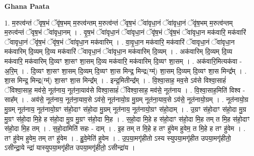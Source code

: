 \documentclass[17pt]{extarticle}
\begin{document}
\textbf{Ghana Paata } \newline

1. म॒रुत्व॑न्तं ॅवृष॒भं ॅवृ॑ष॒भम् म॒रुत्व॑न्तम् म॒रुत्व॑न्तं ॅवृष॒भं ॅवा॑वृधा॒नं ॅवा॑वृधा॒नं ॅवृ॑ष॒भम् म॒रुत्व॑न्तम् म॒रुत्व॑न्तं ॅवृष॒भं ॅवा॑वृधा॒नम् । . वृ॒ष॒भं ॅवा॑वृधा॒नं ॅवा॑वृधा॒नं ॅवृ॑ष॒भं ॅवृ॑ष॒भं ॅवा॑वृधा॒न मक॑वारि॒ मक॑वारिं ॅवावृधा॒नं ॅवृ॑ष॒भं ॅवृ॑ष॒भं ॅवा॑वृधा॒न मक॑वारिम् । . वा॒वृ॒धा॒न मक॑वारि॒ मक॑वारिं ॅवावृधा॒नं ॅवा॑वृधा॒न मक॑वारिम् दि॒व्यम् दि॒व्य मक॑वारिं ॅवावृधा॒नं ॅवा॑वृधा॒न मक॑वारिम् दि॒व्यम् । . अक॑वारिम् दि॒व्यम् दि॒व्य मक॑वारि॒ मक॑वारिम् दि॒व्यꣳ शा॒सꣳ शा॒सम् दि॒व्य मक॑वारि॒ मक॑वारिम् दि॒व्यꣳ शा॒सम् । . अक॑वारि॒मित्यक॑वा - अ॒रि॒म् । . दि॒व्यꣳ शा॒सꣳ शा॒सम् दि॒व्यम् दि॒व्यꣳ शा॒स मिन्द्र॒ मिन्द्र(ग्म्॑) शा॒सम् दि॒व्यम् दि॒व्यꣳ शा॒स मिन्द्र᳚म् । . शा॒स मिन्द्र॒ मिन्द्र(ग्म्॑) शा॒सꣳ शा॒स मिन्द्र᳚म् । . इन्द्र॒मितीन्द्र᳚म् । . वि॒श्वा॒साह॒ मव॒से ऽव॑से विश्वा॒साहं॑ ॅविश्वा॒साह॒ मव॑से॒ नूत॑नाय॒ नूत॑ना॒याव॑से विश्वा॒साहं॑ ॅविश्वा॒साह॒ मव॑से॒ नूत॑नाय । . वि॒श्वा॒साह॒मिति॑ विश्व - साह᳚म् । . अव॑से॒ नूत॑नाय॒ नूत॑ना॒याव॒से ऽव॑से॒ नूत॑नायो॒ग्र मु॒ग्रम् नूत॑ना॒याव॒से ऽव॑से॒ नूत॑नायो॒ग्रम् । . नूत॑नायो॒ग्र मु॒ग्रम् नूत॑नाय॒ नूत॑नायो॒ग्रꣳ स॑हो॒दाꣳ स॑हो॒दा मु॒ग्रम् नूत॑नाय॒ नूत॑नायो॒ग्रꣳ स॑हो॒दाम् । . उ॒ग्रꣳ स॑हो॒दाꣳ स॑हो॒दा मु॒ग्र मु॒ग्रꣳ स॑हो॒दा मि॒हे ह स॑हो॒दा मु॒ग्र मु॒ग्रꣳ स॑हो॒दा मि॒ह । . स॒हो॒दा मि॒हे ह स॑हो॒दाꣳ स॑हो॒दा मि॒ह तम् त मि॒ह स॑हो॒दाꣳ स॑हो॒दा मि॒ह तम् । . स॒हो॒दामिति॑ सहः - दाम् । . इ॒ह तम् त मि॒हे ह तꣳ हु॑वेम हुवेम॒ त मि॒हे ह तꣳ हु॑वेम । . तꣳ हु॑वेम हुवेम॒ तम् तꣳ हु॑वेम । . हु॒वे॒मेति॑ हुवेम । . उ॒प॒या॒मगृ॑हीतो ऽस्य स्युपया॒मगृ॑हीत उपया॒मगृ॑हीतो॒ ऽसीन्द्रा॒ये न्द्रा॑ यास्युपया॒मगृ॑हीत उपया॒मगृ॑हीतो॒ ऽसीन्द्रा॑य । \newline
\end{document}

